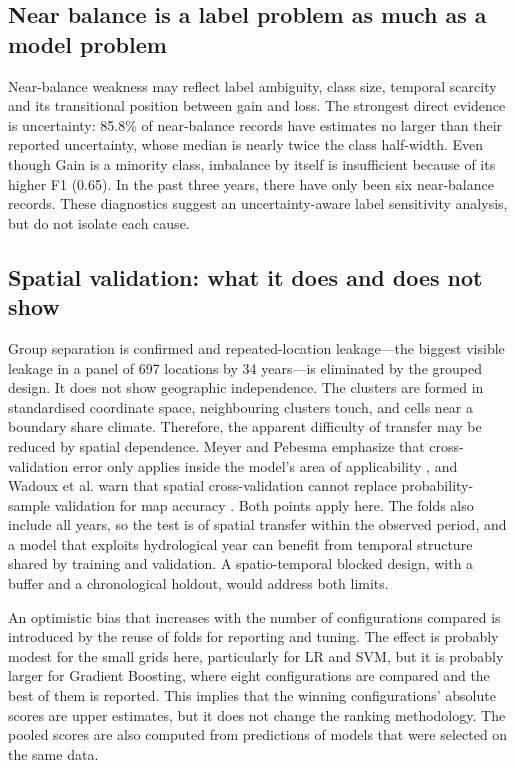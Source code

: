 \documentclass[conference]{IEEEtran}
\begin{document}
\subsection{Near balance is a label problem as much as a model problem}
Near-balance weakness may reflect label ambiguity, class size, temporal scarcity and its transitional position between gain and loss. The strongest direct evidence is uncertainty: 85.8\% of near-balance records have estimates no larger than their reported uncertainty, whose median is nearly twice the class half-width. Even though Gain is a minority class, imbalance by itself is insufficient because of its higher F1 (0.65). In the past three years, there have only been six near-balance records. These diagnostics suggest an uncertainty-aware label sensitivity analysis, but do not isolate each cause.

\subsection{Spatial validation: what it does and does not show}
Group separation is confirmed and repeated-location leakage—the biggest visible leakage in a panel of 697 locations by 34 years—is eliminated by the grouped design. It does not show geographic independence. The clusters are formed in standardised coordinate space, neighbouring clusters touch, and cells near a boundary share climate. Therefore, the apparent difficulty of transfer may be reduced by spatial dependence. Meyer and Pebesma emphasize that cross-validation error only applies inside the model's area of applicability \cite{meyer2021}, and Wadoux et al. warn that spatial cross-validation cannot replace probability-sample validation for map accuracy \cite{wadoux2021}. Both points apply here. The folds also include all years, so the test is of spatial transfer within the observed period, and a model that exploits hydrological year can benefit from temporal structure shared by training and validation. A spatio-temporal blocked design, with a buffer and a chronological holdout, would address both limits.

An optimistic bias that increases with the number of configurations compared is introduced by the reuse of folds for reporting and tuning. The effect is probably modest for the small grids here, particularly for LR and SVM, but it is probably larger for Gradient Boosting, where eight configurations are compared and the best of them is reported. This implies that the winning configurations' absolute scores are upper estimates, but it does not change the ranking methodology. The pooled scores are also computed from predictions of models that were selected on the same data.
\end{document}
